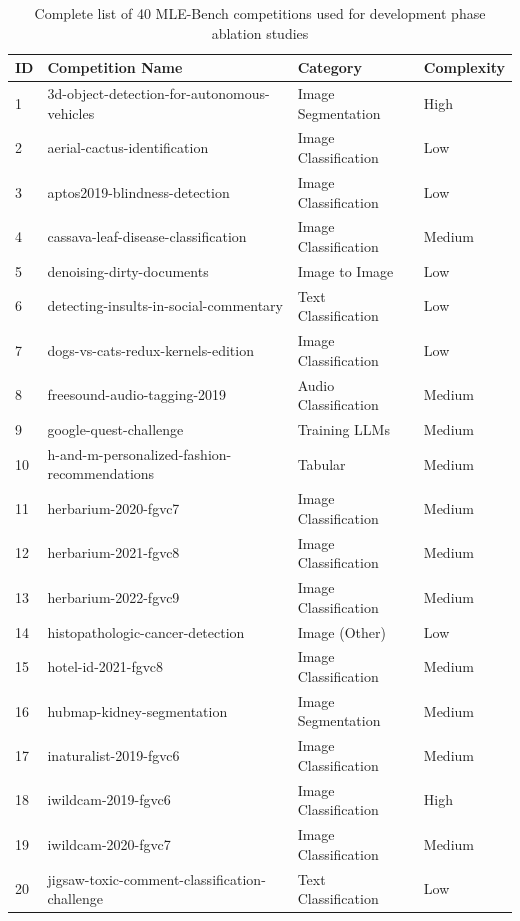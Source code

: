 \begin{table}[htbp]
\centering
\caption{Complete list of 40 MLE-Bench competitions used for development phase ablation studies}
\label{tab:competition_subset}
\footnotesize
\renewcommand{\arraystretch}{1.4}
\begin{tabular}{p{0.6cm} p{6cm} p{3cm} p{1.6cm}}
\toprule
\textbf{ID} & \textbf{Competition Name} & \textbf{Category} & \textbf{Complexity} \\
\midrule
1  & 3d-object-detection-for-autonomous-vehicles & Image Segmentation & High \\
2  & aerial-cactus-identification & Image Classification & Low \\
3  & aptos2019-blindness-detection & Image Classification & Low \\
4  & cassava-leaf-disease-classification & Image Classification & Medium \\
5  & denoising-dirty-documents & Image to Image & Low \\
6  & detecting-insults-in-social-commentary & Text Classification & Low \\
7  & dogs-vs-cats-redux-kernels-edition & Image Classification & Low \\
8  & freesound-audio-tagging-2019 & Audio Classification & Medium \\
9  & google-quest-challenge & Training LLMs & Medium \\
10 & h-and-m-personalized-fashion-recommendations & Tabular & Medium \\
11 & herbarium-2020-fgvc7 & Image Classification & Medium \\
12 & herbarium-2021-fgvc8 & Image Classification & Medium \\
13 & herbarium-2022-fgvc9 & Image Classification & Medium \\
14 & histopathologic-cancer-detection & Image (Other) & Low \\
15 & hotel-id-2021-fgvc8 & Image Classification & Medium \\
16 & hubmap-kidney-segmentation & Image Segmentation & Medium \\
17 & inaturalist-2019-fgvc6 & Image Classification & Medium \\
18 & iwildcam-2019-fgvc6 & Image Classification & High \\
19 & iwildcam-2020-fgvc7 & Image Classification & Medium \\
20 & jigsaw-toxic-comment-classification-challenge & Text Classification & Low \\

\end{tabular}
\end{table}
